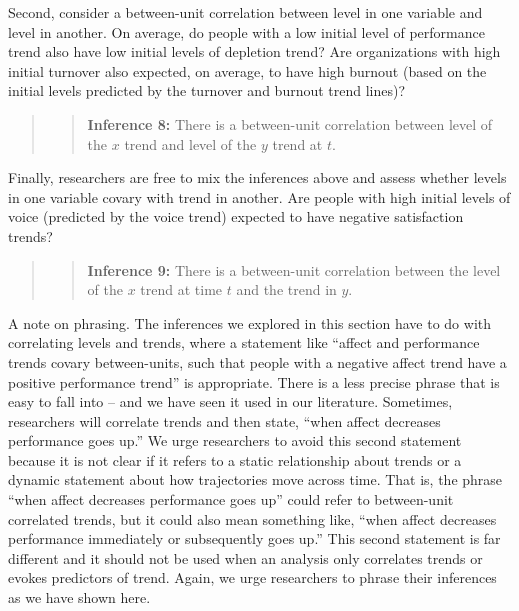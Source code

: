 \documentclass[english,,man]{apa6}
\theoremstyle{definition}
\theoremstyle{definition}
\theoremstyle{definition}
\theoremstyle{remark}
\begin{document}
Second, consider a between-unit correlation between level in one
variable and level in another. On average, do people with a low initial
level of performance trend also have low initial levels of depletion
trend? Are organizations with high initial turnover also expected, on
average, to have high burnout (based on the initial levels predicted by
the turnover and burnout trend lines)?

\begin{quote}
\begin{quote}
\textbf{Inference 8:} There is a between-unit correlation between level
of the \(x\) trend and level of the \(y\) trend at \(t\).
\end{quote}
\end{quote}

Finally, researchers are free to mix the inferences above and assess
whether levels in one variable covary with trend in another. Are people
with high initial levels of voice (predicted by the voice trend)
expected to have negative satisfaction trends?

\begin{quote}
\begin{quote}
\textbf{Inference 9:} There is a between-unit correlation between the
level of the \(x\) trend at time \(t\) and the trend in \(y\).
\end{quote}
\end{quote}

A note on phrasing. The inferences we explored in this section have to
do with correlating levels and trends, where a statement like
\enquote{affect and performance trends covary between-units, such that
people with a negative affect trend have a positive performance trend}
is appropriate. There is a less precise phrase that is easy to fall into
-- and we have seen it used in our literature. Sometimes, researchers
will correlate trends and then state, \enquote{when affect decreases
performance goes up.} We urge researchers to avoid this second statement
because it is not clear if it refers to a static relationship about
trends or a dynamic statement about how trajectories move across time.
That is, the phrase \enquote{when affect decreases performance goes up}
could refer to between-unit correlated trends, but it could also mean
something like, \enquote{when affect decreases performance immediately
or subsequently goes up.} This second statement is far different and it
should not be used when an analysis only correlates trends or evokes
predictors of trend. Again, we urge researchers to phrase their
inferences as we have shown here.
\end{document}

